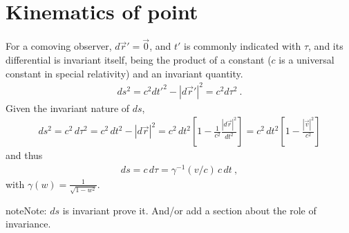 \documentclass[letterpaper,10pt,english]{jupyterBook}
\begin{document}
\section{Kinematics of point}
\label{\detokenize{ch/relativity-special/notes:kinematics-of-point}}
\sphinxAtStartPar
{} For a co\sphinxhyphen{}moving observer, \(d \vec{r}' = \vec{0}\), and \(t'\) is commonly indicated with \(\tau\), and its differential is invariant itself, being the product of a constant (\(c\) is a universal constant in special relativity) and an invariant quantity.
\begin{equation*}
\begin{split}d s^2 = c^2 dt'^2 - |d \vec{r}'|^2 = c^2 d \tau^2 \ .\end{split}
\end{equation*}
\sphinxAtStartPar
Given the invariant nature of \(d s\),
\begin{equation*}
\begin{split}d s^2 = c^2 \, d \tau^2 = c^2 \, dt^2 - |d \vec{r}|^2 = c^2 \, dt^2 \left[ 1 - \frac{1}{c^2}\frac{|d\vec{r}|^2}{dt^2} \right] = c^2 \, dt^2 \left[ 1 - \frac{|\vec{v}|^2}{c^2} \right]\end{split}
\end{equation*}
\sphinxAtStartPar
and thus
\begin{equation*}
\begin{split}d s = c \, d \tau = \gamma^{-1}(v/c) \, c \, dt \ ,\end{split}
\end{equation*}
\sphinxAtStartPar
with \(\gamma(w) = \frac{1}{\sqrt{1 - w^2}}\).

\begin{sphinxadmonition}{note}{Note:}
\sphinxAtStartPar
\(ds\) is invariant
 prove it. And/or add a section about the role of invariance.
\end{sphinxadmonition}
\end{document}

